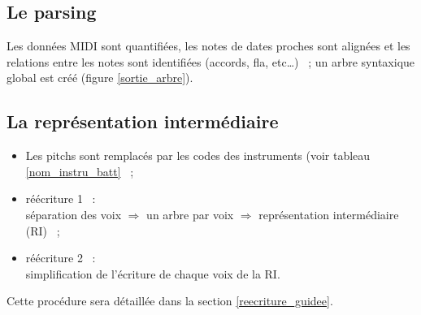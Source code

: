 %

\subsection*{Le parsing}
Les données MIDI sont quantifiées, les notes de dates proches sont alignées et
les relations entre les notes sont identifiées (accords, fla, etc…)~ ; un arbre
syntaxique global est créé (figure \ref{sortie_arbre}). 

\subsection*{La représentation intermédiaire}
\label{regles}
\begin{itemize}
    \item Les pitchs sont remplacés par les codes des instruments (voir tableau
    \ref{nom_instru_batt}~ ;
    \item réécriture 1~ :\\
    séparation des voix $\Rightarrow$ un arbre par voix
    $\Rightarrow$ représentation intermédiaire (RI)~ ;
    \item réécriture 2~ :\\
    simplification de l’écriture de chaque voix de la RI.\\
\end{itemize}
Cette procédure sera détaillée dans la section \ref{reecriture_guidee}.
